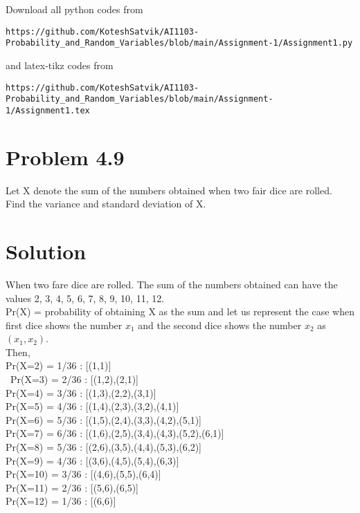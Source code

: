 \documentclass[journal,12pt,twocolumn]{IEEEtran}
\begin{document}
\author{Songa Kotesh Satvik}
\maketitle
\newpage
\bigskip
\renewcommand{\thefigure}{\theenumi}
\renewcommand{\thetable}{\theenumi}
Download all python codes from 
\begin{lstlisting}
https://github.com/KoteshSatvik/AI1103-Probability_and_Random_Variables/blob/main/Assignment-1/Assignment1.py
\end{lstlisting}
%
and latex-tikz codes from 
%
\begin{lstlisting}
https://github.com/KoteshSatvik/AI1103-Probability_and_Random_Variables/blob/main/Assignment-1/Assignment1.tex
\end{lstlisting}
\section{Problem 4.9}
Let X denote the sum of the numbers obtained when two fair dice are rolled. Find the variance and standard deviation of X.
\section{Solution}
 When two fare dice are rolled. The sum of the numbers obtained can have the values 2, 3, 4, 5, 6, 7, 8, 9, 10, 11, 12.\\
Pr(X) = probability of obtaining X as the sum and let us represent the case when first dice shows the number $x_1$ and the second dice shows the number $x_2$ as $(x_1,x_2)$.\\
\vspace{2mm}
Then,\\
Pr(X=2) = 1/36 : [(1,1)]\\\
Pr(X=3) = 2/36 : [(1,2),(2,1)]\\
Pr(X=4) = 3/36 : [(1,3),(2,2),(3,1)]\\
Pr(X=5) = 4/36 : [(1,4),(2,3),(3,2),(4,1)]\\
Pr(X=6) = 5/36 : [(1,5),(2,4),(3,3),(4,2),(5,1)]\\
Pr(X=7) = 6/36 : [(1,6),(2,5),(3,4),(4,3),(5,2),(6,1)]\\
Pr(X=8) = 5/36 : [(2,6),(3,5),(4,4),(5,3),(6,2)]\\
Pr(X=9) = 4/36 : [(3,6),(4,5),(5,4),(6,3)]\\
Pr(X=10) = 3/36 : [(4,6),(5,5),(6,4)]\\
Pr(X=11) = 2/36 : [(5,6),(6,5)]\\
Pr(X=12) = 1/36 : [(6,6)]\\
\vspace{5mm}
\end{document}
